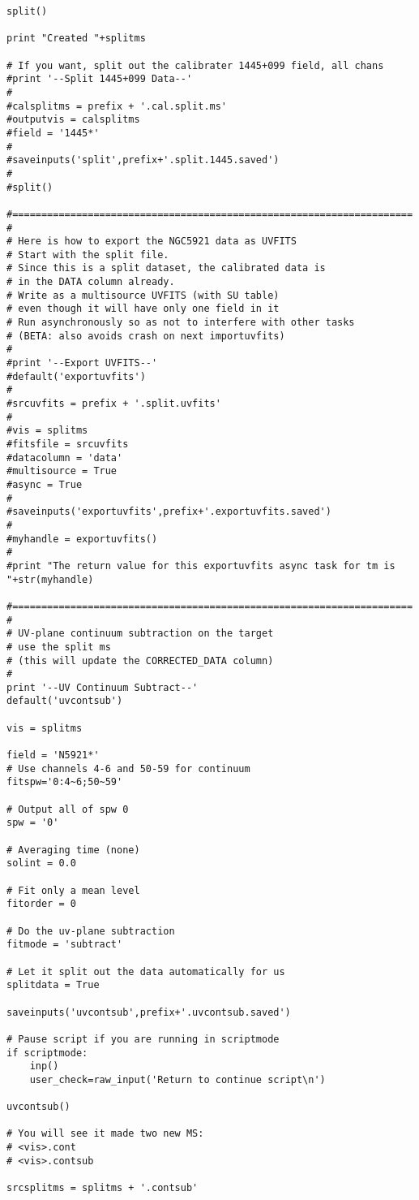 \begin{verbatim}
split()

print "Created "+splitms

# If you want, split out the calibrater 1445+099 field, all chans
#print '--Split 1445+099 Data--'
#
#calsplitms = prefix + '.cal.split.ms'
#outputvis = calsplitms
#field = '1445*'
#
#saveinputs('split',prefix+'.split.1445.saved')
#
#split()

#=====================================================================
#
# Here is how to export the NGC5921 data as UVFITS
# Start with the split file.
# Since this is a split dataset, the calibrated data is
# in the DATA column already.
# Write as a multisource UVFITS (with SU table)
# even though it will have only one field in it
# Run asynchronously so as not to interfere with other tasks
# (BETA: also avoids crash on next importuvfits)
#
#print '--Export UVFITS--'
#default('exportuvfits')
#
#srcuvfits = prefix + '.split.uvfits'
#
#vis = splitms
#fitsfile = srcuvfits
#datacolumn = 'data'
#multisource = True
#async = True
#
#saveinputs('exportuvfits',prefix+'.exportuvfits.saved')
#
#myhandle = exportuvfits()
#
#print "The return value for this exportuvfits async task for tm is "+str(myhandle)

#=====================================================================
#
# UV-plane continuum subtraction on the target
# use the split ms
# (this will update the CORRECTED_DATA column)
#
print '--UV Continuum Subtract--'
default('uvcontsub')

vis = splitms

field = 'N5921*'
# Use channels 4-6 and 50-59 for continuum
fitspw='0:4~6;50~59'

# Output all of spw 0
spw = '0'

# Averaging time (none)
solint = 0.0

# Fit only a mean level
fitorder = 0

# Do the uv-plane subtraction
fitmode = 'subtract'

# Let it split out the data automatically for us
splitdata = True

saveinputs('uvcontsub',prefix+'.uvcontsub.saved')

# Pause script if you are running in scriptmode
if scriptmode:
    inp()
    user_check=raw_input('Return to continue script\n')

uvcontsub()

# You will see it made two new MS:
# <vis>.cont
# <vis>.contsub

srcsplitms = splitms + '.contsub'


\end{verbatim}
